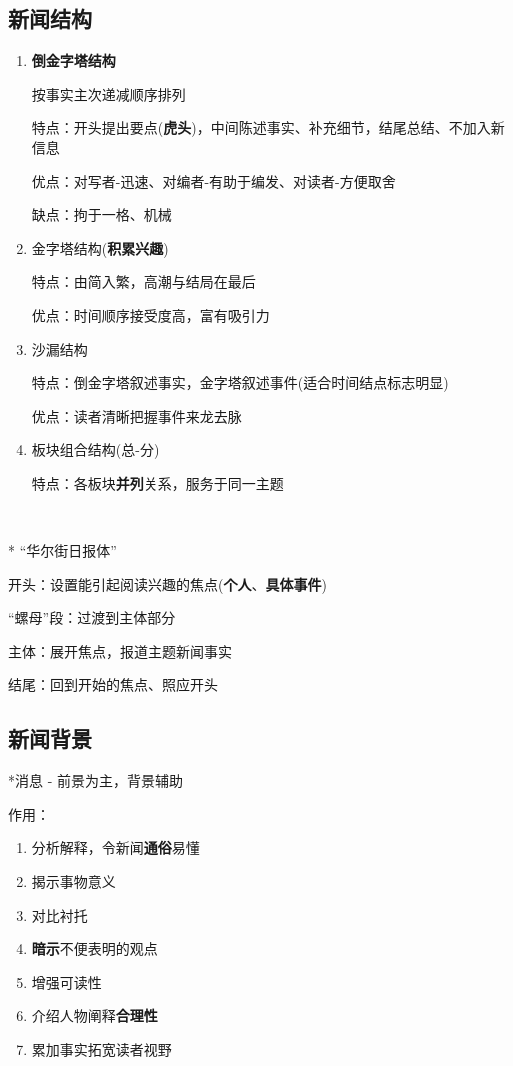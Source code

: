 \documentclass[a4paper,UTF8]{ctexart}
\begin{document}
\subsection{新闻结构}
\begin{enumerate}
	\item \textbf{倒金字塔结构}
	
	按事实主次递减顺序排列
	
	特点：开头提出要点(\textbf{虎头})，中间陈述事实、补充细节，结尾总结、不加入新信息
	
	优点：对写者-迅速、对编者-有助于编发、对读者-方便取舍
	
	缺点：拘于一格、机械
	
	\item 金字塔结构(\textbf{积累兴趣})
	
	特点：由简入繁，高潮与结局在最后
	
	优点：时间顺序接受度高，富有吸引力
	
	\item 沙漏结构
	
	特点：倒金字塔叙述事实，金字塔叙述事件(适合时间结点标志明显)
	
	优点：读者清晰把握事件来龙去脉
	
	\item 板块组合结构(总-分)
	
	特点：各板块\textbf{并列}关系，服务于同一主题
	
	
\end{enumerate}

~

* “华尔街日报体”

开头：设置能引起阅读兴趣的焦点(\textbf{个人}、\textbf{具体事件})

“螺母”段：过渡到主体部分

主体：展开焦点，报道主题新闻事实

结尾：回到开始的焦点、照应开头

\subsection{新闻背景}
*消息 - 前景为主，背景辅助

作用：

\begin{enumerate}
	\item 分析解释，令新闻\textbf{通俗}易懂
	\item 揭示事物意义
	\item 对比衬托
	\item \textbf{暗示}不便表明的观点
	\item 增强可读性
	\item 介绍人物阐释\textbf{合理性}
	\item 累加事实拓宽读者视野
\end{enumerate}
\end{document}
